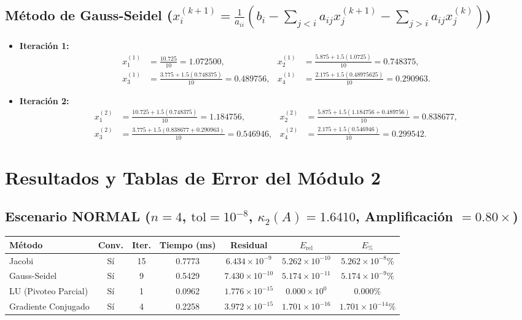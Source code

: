 \documentclass[11pt,a4paper]{article}
\begin{document}
\subsection{Método de Gauss-Seidel ($x_i^{(k+1)} = \frac{1}{a_{ii}}(b_i - \sum_{j<i} a_{ij}x_j^{(k+1)} - \sum_{j>i} a_{ij}x_j^{(k)})$)}
\begin{itemize}
    \item \textbf{Iteración 1:}
    \begin{align*}
        x_1^{(1)} &= \frac{10.725}{10} = 1.072500, &
        x_2^{(1)} &= \frac{5.875 + 1.5(1.0725)}{10} = 0.748375, \\
        x_3^{(1)} &= \frac{3.775 + 1.5(0.748375)}{10} = 0.489756, &
        x_4^{(1)} &= \frac{2.175 + 1.5(0.48975625)}{10} = 0.290963.
    \end{align*}
    \item \textbf{Iteración 2:}
    \begin{align*}
        x_1^{(2)} &= \frac{10.725 + 1.5(0.748375)}{10} = 1.184756, &
        x_2^{(2)} &= \frac{5.875 + 1.5(1.184756 + 0.489756)}{10} = 0.838677, \\
        x_3^{(2)} &= \frac{3.775 + 1.5(0.838677 + 0.290963)}{10} = 0.546946, &
        x_4^{(2)} &= \frac{2.175 + 1.5(0.546946)}{10} = 0.299542.
    \end{align*}
\end{itemize}

\section{Resultados y Tablas de Error del Módulo 2}

\subsection{Escenario NORMAL ($n=4$, $\text{tol}=10^{-8}$, $\kappa_2(A)=1.6410$, Amplificación $=0.80\times$)}
\begin{table}[h!]
\centering
\begin{tabular}{lcccccc}
\toprule
\textbf{Método} & \textbf{Conv.} & \textbf{Iter.} & \textbf{Tiempo (ms)} & \textbf{Residual} & $E_{\text{rel}}$ & $E_{\%}$ \\
\midrule
Jacobi & Sí & 15 & 0.7773 & $6.434\times 10^{-9}$ & $5.262\times 10^{-10}$ & $5.262\times 10^{-8}\%$ \\
Gauss-Seidel & Sí & 9 & 0.5429 & $7.430\times 10^{-10}$ & $5.174\times 10^{-11}$ & $5.174\times 10^{-9}\%$ \\
LU (Pivoteo Parcial) & Sí & 1 & 0.0962 & $1.776\times 10^{-15}$ & $0.000\times 10^{0}$ & $0.000\%$ \\
Gradiente Conjugado & Sí & 4 & 0.2258 & $3.972\times 10^{-15}$ & $1.701\times 10^{-16}$ & $1.701\times 10^{-14}\%$ \\
\bottomrule
\end{tabular}
\end{table}
\end{document}
